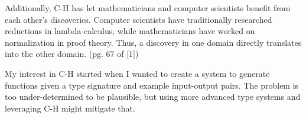 Additionally, C-H has let mathematicians and computer scientists benefit from each other's discoveries. Computer scientists have traditionally researched reductions in lambda-calculus, while mathematicians have worked on normalization in proof theory. Thus, a discovery in one domain directly translates into the other domain. (pg. 67 of [1])

My interest in C-H started when I wanted to create a system to generate functions given a type signature and example input-output pairs. The problem is too under-determined to be plausible, but using more advanced type systems and leveraging C-H might mitigate that.
